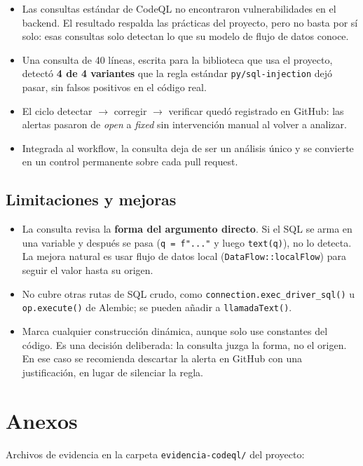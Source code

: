 \documentclass[11pt,a4paper]{article}
\newcommand{\cod}[1]{\texttt{#1}}
\begin{document}
\begin{itemize}
  \item Las consultas estándar de CodeQL no encontraron vulnerabilidades en el backend. El resultado respalda las prácticas del proyecto, pero no basta por sí solo: esas consultas solo detectan lo que su modelo de flujo de datos conoce.
  \item Una consulta de 40 líneas, escrita para la biblioteca que usa el proyecto, detectó \textbf{4 de 4 variantes} que la regla estándar \cod{py/sql-injection} dejó pasar, sin falsos positivos en el código real.
  \item El ciclo detectar $\rightarrow$ corregir $\rightarrow$ verificar quedó registrado en GitHub: las alertas pasaron de \emph{open} a \emph{fixed} sin intervención manual al volver a analizar.
  \item Integrada al workflow, la consulta deja de ser un análisis único y se convierte en un control permanente sobre cada pull request.
\end{itemize}

\subsection{Limitaciones y mejoras}

\begin{itemize}
  \item La consulta revisa la \textbf{forma del argumento directo}. Si el SQL se arma en una variable y después se pasa (\cod{q = f"..."} y luego \cod{text(q)}), no lo detecta. La mejora natural es usar flujo de datos local (\cod{DataFlow::localFlow}) para seguir el valor hasta su origen.
  \item No cubre otras rutas de SQL crudo, como \cod{connection.exec\_driver\_sql()} u \cod{op.execute()} de Alembic; se pueden añadir a \cod{llamadaText()}.
  \item Marca cualquier construcción dinámica, aunque solo use constantes del código. Es una decisión deliberada: la consulta juzga la forma, no el origen. En ese caso se recomienda descartar la alerta en GitHub con una justificación, en lugar de silenciar la regla.
\end{itemize}

\section{Anexos}

Archivos de evidencia en la carpeta \cod{evidencia-codeql/} del proyecto:
\end{document}
